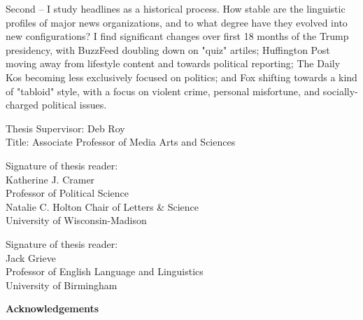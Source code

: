 \documentclass{scrartcl}
\begin{document}
Second -- I study headlines as a historical process. How stable are the linguistic profiles of major news organizations, and to what degree have they evolved into new configurations? I find significant changes over first 18 months of the Trump presidency, with BuzzFeed doubling down on "quiz" artiles; Huffington Post moving away from lifestyle content and towards political reporting; The Daily Kos becoming less exclusively focused on politics; and Fox shifting towards a kind of "tabloid" style, with a focus on violent crime, personal misfortune, and socially-charged political issues.

Thesis Supervisor: Deb Roy\\
Title: Associate Professor of Media Arts and Sciences

\newpage
\maketitle

Signature of thesis reader: \makebox[\linegoal]{\hrulefill}\\

Katherine J. Cramer\\
Professor of Political Science\\
Natalie C. Holton Chair of Letters \& Science\\
University of Wisconsin-Madison

\newpage
\maketitle

Signature of thesis reader: \makebox[\linegoal]{\hrulefill}\\

Jack Grieve\\
Professor of English Language and Linguistics\\
University of Birmingham

\newpage

\begin{center}
\textbf{Acknowledgements}
\end{center}
\end{document}
